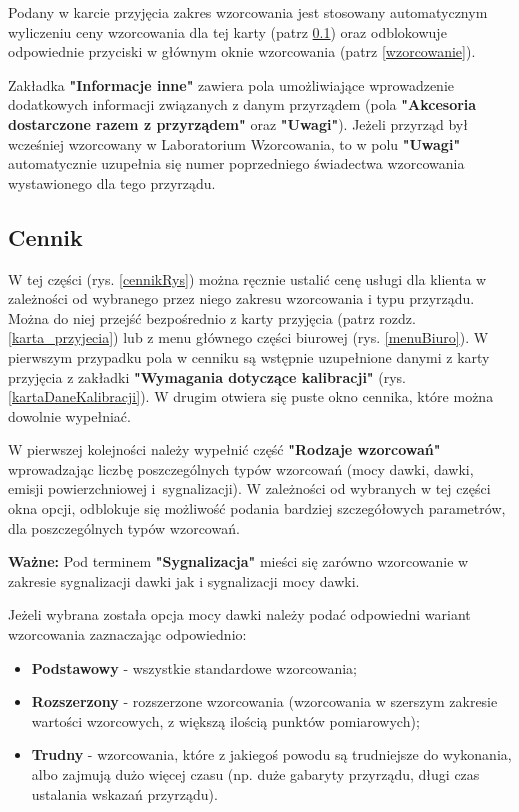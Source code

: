 Podany w karcie przyjęcia zakres wzorcowania jest stosowany automatycznym wyliczeniu ceny wzorcowania dla tej karty (patrz \ref{cennik}) oraz odblokowuje odpowiednie przyciski w głównym oknie wzorcowania (patrz \ref{wzorcowanie}).

Zakładka \textbf{"Informacje inne"} zawiera pola umożliwiające wprowadzenie dodatkowych informacji związanych z danym przyrządem (pola \textbf{"Akcesoria dostarczone razem z przyrządem"} oraz \textbf{"Uwagi"}). Jeżeli przyrząd był wcześniej wzorcowany w Laboratorium Wzorcowania, to w polu \textbf{"Uwagi"} automatycznie uzupełnia się numer poprzedniego świadectwa wzorcowania wystawionego dla tego przyrządu.

\subsection{Cennik}
\label{cennik}

W tej części (rys. \ref{cennikRys}) można ręcznie ustalić cenę usługi dla klienta w zależności od wybranego przez niego zakresu wzorcowania i typu przyrządu. Można do niej przejść bezpośrednio z karty przyjęcia (patrz rozdz. \ref{karta_przyjecia}) lub z menu głównego części biurowej (rys. \ref{menuBiuro}). W pierwszym przypadku pola w cenniku są wstępnie uzupełnione danymi z karty przyjęcia z zakładki \textbf{"Wymagania dotyczące kalibracji"} (rys. \ref{kartaDaneKalibracji}). W drugim otwiera się puste okno cennika, które można dowolnie wypełniać.

W pierwszej kolejności należy wypełnić część \textbf{"Rodzaje wzorcowań"} wprowadzając liczbę poszczególnych typów wzorcowań (mocy dawki, dawki, emisji powierzchniowej i~sygnalizacji). W zależności od wybranych w tej części okna opcji, odblokuje się możliwość podania bardziej szczegółowych parametrów, dla poszczególnych typów wzorcowań.

\textbf{Ważne:} Pod terminem \textbf{"Sygnalizacja"} mieści się zarówno wzorcowanie w zakresie sygnalizacji dawki jak i sygnalizacji mocy dawki.

Jeżeli wybrana została opcja mocy dawki należy podać odpowiedni wariant wzorcowania zaznaczając odpowiednio:
\begin{itemize}
	\item \textbf{Podstawowy} - wszystkie standardowe wzorcowania;
	\item \textbf{Rozszerzony} - rozszerzone wzorcowania (wzorcowania w szerszym zakresie wartości wzorcowych, z większą ilością punktów pomiarowych);
	\item \textbf{Trudny} - wzorcowania, które z jakiegoś powodu są trudniejsze do wykonania, albo zajmują dużo więcej czasu (np. duże gabaryty przyrządu, długi czas ustalania wskazań przyrządu).
\end{itemize}

